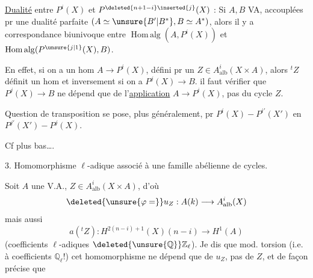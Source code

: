 \uline{Dualité} entre \(P^i(X)\) et \(P^{\deleted{n+1-i}\inserted{j}}(X)\)  : Si \(A,B\)   VA,  accouplées pr une dualité parfaite \((A\simeq\unsure{B'|B^*},B\simeq A^*)\), alors il y a correspondance biunivoque entre \(\operatorname{Hom\,alg}(A,P^i(X))\) et \(\operatorname{Hom\,alg}(P^{\unsure{j|1}}(X),B)\).

En effet, si on a un hom \(A\longrightarrow P^i(X)\), défini pr un \(Z\in A^i_{\mathrm{alb}}(X\times A)\), alors \({}^tZ\) définit un hom
et inversement si on a \(P^j(X)\longrightarrow B\). 
il faut vérifier que \(P^j(X)\longrightarrow B\) ne dépend que de l'\uline{application} \(A\longrightarrow P^i(X)\), pas du cycle \(Z\).

Question de transposition se pose, plus généralement, pr \(P^i(X)\mathbin{-}P^{i'}(X')\) en \(P^{j'}(X')\mathbin{-}P^j(X)\).

Cf plus bas\ldots.


3. Homomorphisme \(\ell\)-adique associé à une  famille abélienne de cycles.

Soit \(A\) une V.A., \(Z\in A^i_{\mathrm{alb}}(X\times A)\), d'où
\[
\deleted{\unsure{\varphi=}}u_Z:A(k)\longrightarrow A^i_{\mathrm{alb}}(X)
\]
mais aussi
\[
a({}^tZ):H^{2(n-i)+1}(X)(n-i)\longrightarrow H^1(A)
\]
(coefficients \(\ell\)-adiques \(\deleted{\unsure{\mathbb Q}}\mathbb Z_\ell\)). Je dis que mod. torsion (i.e. à coefficients \(\mathbb Q_\ell\)!) cet homomorphisme ne dépend que de \(u_Z\), pas de \(Z\),  et de façon précise que


